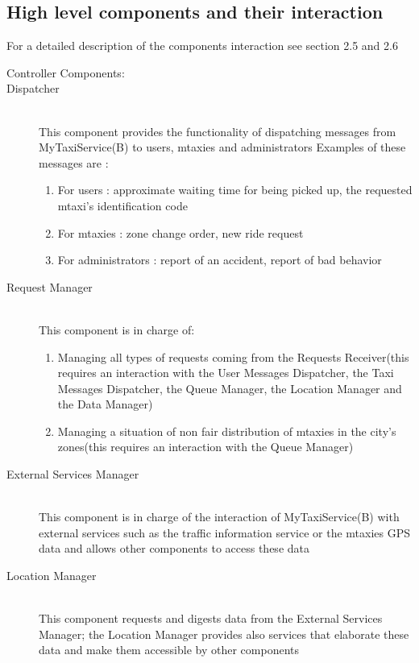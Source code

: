 \documentclass[11pt,titlepage]{article} %
\begin{document}
\subsection{High level components and their interaction}
	For a detailed description of the components interaction see section 2.5 and 2.6\newline
	\begin{description}
		\item [Controller Components:] 
		           \item [Dispatcher] \hfill \\
		           This component provides the functionality of dispatching messages from MyTaxiService(B) to users, mtaxies and administrators
		            Examples of these messages are :
			 \begin{enumerate}
			            \item For users : approximate waiting time for being picked up, the requested mtaxi's identification code
			            \item For mtaxies : zone change order, new ride request
			            \item For administrators : report of an accident, report of bad behavior
			\end{enumerate}
		        \item [Request Manager] \hfill \\
		           This component is in charge of:
			 \begin{enumerate}
			            \item Managing all types of requests coming from the Requests Receiver(this requires an
			            interaction with the User Messages Dispatcher, the Taxi Messages Dispatcher, the Queue Manager, the
			            Location Manager and the Data Manager)
			            \item Managing a situation of non fair distribution of mtaxies in the city's zones(this requires an interaction
			            with the Queue Manager)
			\end{enumerate}
		        \item [External Services Manager] \hfill \\
		            This component is in charge of the interaction of MyTaxiService(B) with external services such as
		            the traffic information service or the mtaxies GPS data and allows other components to access these data
		
		        \item  [Location Manager] \hfill \\
		            This component requests and digests data from the External Services Manager; the Location Manager
		            provides also services that elaborate these data and make them accessible by other components
		

\end{description}
\end{document}
